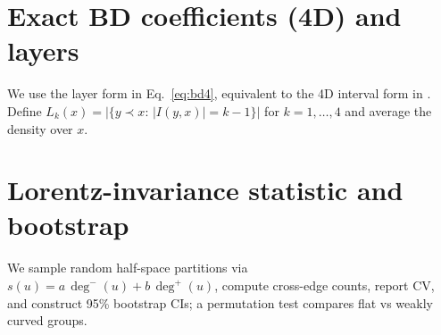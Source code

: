 \section{Exact BD coefficients (4D) and layers}
We use the layer form in Eq.~\eqref{eq:bd4}, equivalent to the 4D interval form in \citet{BenincasaDowker2010}. Define
$L_k(x)=|\{y\prec x:\,|I(y,x)|=k-1\}|$ for $k=1,\dots,4$ and average the density over $x$.

\section{Lorentz-invariance statistic and bootstrap}
We sample random half-space partitions via $s(u)=a\,\deg^{-}(u)+b\,\deg^{+}(u)$, compute cross-edge counts, report CV, and construct 95\% bootstrap CIs; a permutation test compares flat vs weakly curved groups.

\FloatBarrier
\clearpage




